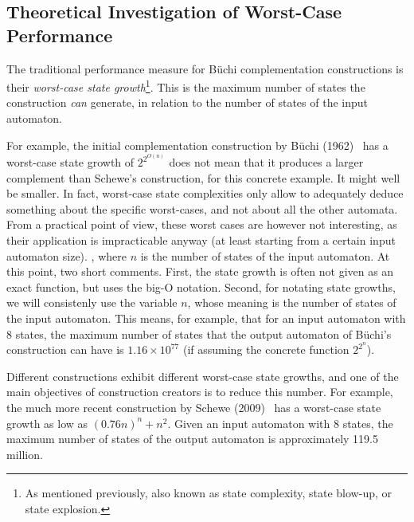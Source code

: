 \subsection{Theoretical Investigation of Worst-Case Performance}
The traditional performance measure for Büchi complementation constructions is their \textit{worst-case state growth}\footnote{As mentioned previously, also known as state complexity, state blow-up, or state explosion.}. This is the maximum number of states the construction \textit{can} generate, in relation to the number of states of the input automaton.

For example, the initial complementation construction by Büchi (1962)~\cite{buchi1960decision} has a worst-case state growth of $2^{2^{O\left(n\right)}}$ does not mean that it produces a larger complement than Schewe's construction, for this concrete example. It might well be smaller. In fact, worst-case state complexities only allow to adequately deduce something about the specific worst-cases, and not about all the other automata. From a practical point of view, these worst cases are however not interesting, as their application is impracticable anyway (at least starting from a certain input automaton size). , where $n$ is the number of states of the input automaton. At this point, two short comments. First, the state growth is often not given as an exact function, but uses the big-O notation. Second, for notating state growths, we will consistenly use the variable $n$, whose meaning is the number of states of the input automaton. This means, for example, that for an input automaton with 8 states, the maximum number of states that the output automaton of Büchi's construction can have is $1.16 \times 10^77$ (if assuming the concrete function $2^{2^n}$).

Different constructions exhibit different worst-case state growths, and one of the main objectives of construction creators is to reduce this number. For example, the much more recent construction by Schewe (2009)~\cite{schewe2009buchi} has a worst-case state growth as low as $(0.76n)^n + n^2$. Given an input automaton with 8 states, the maximum number of states of the output automaton is approximately 119.5 million.

